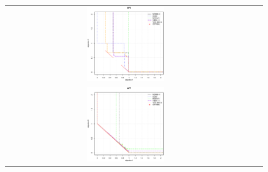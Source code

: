 \begin{figure}[h]
\begin{tabular}{ccc}
  \includegraphics[width=0.33\textwidth]{Figures_Chapter7/Results_Chapter3/UF6.eps} 
\\
  \includegraphics[width=0.33\textwidth]{Figures_Chapter7/Results_Chapter3/UF7.eps}
\end{tabular}
\end{figure}  

